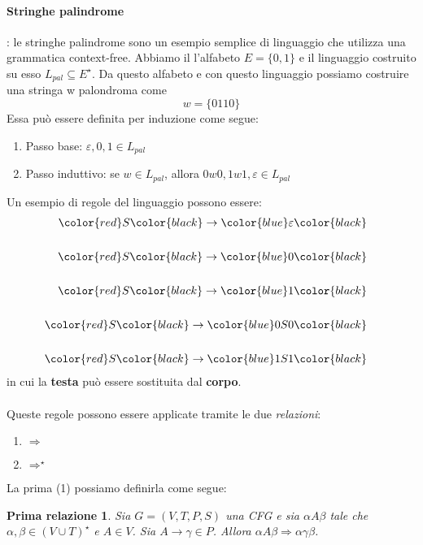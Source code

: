 \documentclass[11pt]{article}
\newtheorem{relazioneNorm}{Prima relazione}
\begin{document}
\paragraph{Stringhe palindrome}: le stringhe palindrome sono un esempio semplice di linguaggio che utilizza una grammatica context-free.
Abbiamo il l'alfabeto $E = \{0,1\}$ e il linguaggio costruito su esso $L_{pal} \subseteq E^{\star}$. Da questo alfabeto e con questo linguaggio possiamo costruire una stringa w palondroma come $$w = \{0110\}$$
Essa può essere definita per induzione come segue:
\begin{enumerate}
\item Passo base: $\varepsilon , 0, 1 \in L_{pal}$
\item Passo induttivo: se $w \in L_{pal}$, allora $0w0, 1w1, \varepsilon \in L_{pal}$
\end{enumerate}
Un esempio di regole del linguaggio possono essere:
\begin{equation}
\begin{split}
\color{red}S \color{black} \rightarrow \color{blue}\varepsilon\color{black}\\&\\
\color{red}S \color{black} \rightarrow \color{blue}0 \color{black}\\&\\
\color{red}S \color{black} \rightarrow \color{blue}1 \color{black}\\&\\ 
\color{red}S \color{black} \rightarrow \color{blue}0S0 \color{black}\\&\\
\color{red}S \color{black} \rightarrow \color{blue}1S1\color{black}
\end{split}
\end{equation}
in cui la \color{red} \textbf{testa} \color{black} può essere sostituita dal \color{blue} \textbf{corpo}\color{black}.
\\ \\
Queste regole possono essere applicate tramite le due \emph{relazioni}:
\begin{enumerate}
\item $\Rightarrow$
\item $\Rightarrow^{\star}$
\end{enumerate}
La prima (1) possiamo definirla come segue:
\begin{relazioneNorm}
Sia $G=(V, T,P,S)$ una CFG e sia $\alpha A \beta$ tale che $\alpha,\beta \in (V\cup T)^{\star}$ e $A \in V$. Sia $A \rightarrow \gamma \in P$. Allora $\alpha A\beta \Rightarrow \alpha \gamma \beta$.
\end{relazioneNorm}
\end{document}
